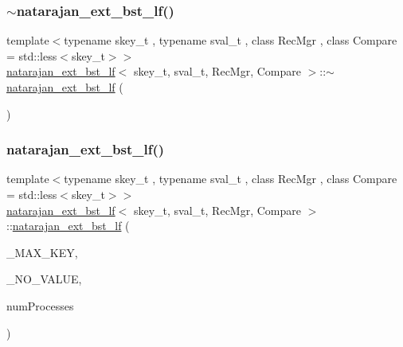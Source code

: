 \mbox{\label{classnatarajan__ext__bst__lf_a3dfa7398463b014b9a1a86d4068dd7a5}} 
\subsubsection{\texorpdfstring{$\sim$natarajan\+\_\+ext\+\_\+bst\+\_\+lf()}{~natarajan\_ext\_bst\_lf()}\hspace{0.1cm}{\footnotesize\ttfamily [1/2]}}
{\footnotesize\ttfamily template$<$typename skey\+\_\+t , typename sval\+\_\+t , class Rec\+Mgr , class Compare  = std\+::less$<$skey\+\_\+t$>$$>$ \\
\hyperlink{classnatarajan__ext__bst__lf}{natarajan\+\_\+ext\+\_\+bst\+\_\+lf}$<$ skey\+\_\+t, sval\+\_\+t, Rec\+Mgr, Compare $>$\+::$\sim$\hyperlink{classnatarajan__ext__bst__lf}{natarajan\+\_\+ext\+\_\+bst\+\_\+lf} (\begin{DoxyParamCaption}{ }\end{DoxyParamCaption})\hspace{0.3cm}{\ttfamily [inline]}}

\mbox{\label{classnatarajan__ext__bst__lf_a3004e0b831b62ffbe50fce8c0bccdd53}} 
\subsubsection{\texorpdfstring{natarajan\+\_\+ext\+\_\+bst\+\_\+lf()}{natarajan\_ext\_bst\_lf()}\hspace{0.1cm}{\footnotesize\ttfamily [2/2]}}
{\footnotesize\ttfamily template$<$typename skey\+\_\+t , typename sval\+\_\+t , class Rec\+Mgr , class Compare  = std\+::less$<$skey\+\_\+t$>$$>$ \\
\hyperlink{classnatarajan__ext__bst__lf}{natarajan\+\_\+ext\+\_\+bst\+\_\+lf}$<$ skey\+\_\+t, sval\+\_\+t, Rec\+Mgr, Compare $>$\+::\hyperlink{classnatarajan__ext__bst__lf}{natarajan\+\_\+ext\+\_\+bst\+\_\+lf} (\begin{DoxyParamCaption}\item[{const skey\+\_\+t \&}]{\+\_\+\+M\+A\+X\+\_\+\+K\+EY,  }\item[{const sval\+\_\+t \&}]{\+\_\+\+N\+O\+\_\+\+V\+A\+L\+UE,  }\item[{const int}]{num\+Processes }\end{DoxyParamCaption})\hspace{0.3cm}{\ttfamily [inline]}}

